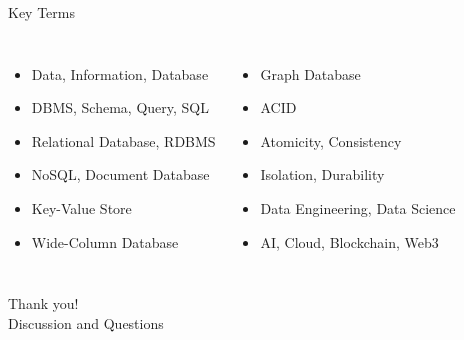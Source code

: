 \documentclass[aspectratio=169,11pt]{beamer}
\newcommand{\tightlist}{\setlength{\itemsep}{2pt}\setlength{\parskip}{0pt}}
\begin{document}
\begin{frame}{Key Terms}
\small
\begin{columns}[T]
\begin{itemize}
\tightlist
  \item Data, Information, Database
  \item DBMS, Schema, Query, SQL
  \item Relational Database, RDBMS
  \item NoSQL, Document Database
  \item Key-Value Store
  \item Wide-Column Database
\end{itemize}
\begin{itemize}
\tightlist
  \item Graph Database
  \item ACID
  \item Atomicity, Consistency
  \item Isolation, Durability
  \item Data Engineering, Data Science
  \item AI, Cloud, Blockchain, Web3
\end{itemize}
\end{columns}
\end{frame}

\begin{frame}
\centering
\Huge Thank you!\\[0.5cm]
\Large Discussion and Questions
\end{frame}
\end{document}
